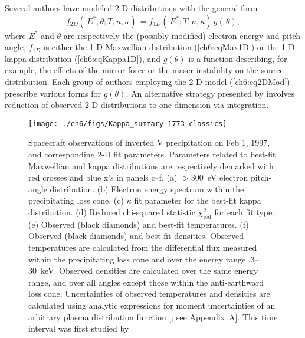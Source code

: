  Several authors \citep{Maggs1981,Bingham1999,Bingham2000,Mutel2007} have
  modeled 2-D distributions with the general form
    \begin{equation} \label{ch6:eq2DMod} f_{2D}(\, E^*, \theta ; T, n,
      \kappa) \, = f_{1D}(\, E^*; T, n, \kappa) \, g(\, \theta),
    \end{equation}
  where $E^*$ and $\theta$ are respectively the (possibly modified) electron
  energy and pitch angle, $f_{1D}$ is either the 1-D Maxwellian distribution
  (\ref{ch6:eqMax1D}) or the 1-D kappa distribution (\ref{ch6:eqKappa1D}), and
  $g(\theta )$ is a function describing, for example, the effects of the mirror
  force or the maser instability on the source distribution. Each group of
  authors employing the 2-D model (\ref{ch6:eq2DMod}) prescribe various forms
  for $g(\theta)$. An alternative strategy presented by \citet{Pritchett1999}
  involves reduction of observed 2-D distributions to one dimension via
  integration.


  \begin{figure}
    \centering
    \noindent\texttt{[image: ./ch6/figs/Kappa\_summary--1773-classics]}
    \caption[Inverted V precipitation and best-fit Maxwellian and kappa
    distribution parameters (Orbit 1773)]{Spacecraft observations of inverted V
      precipitation on Feb 1, 1997, and corresponding 2-D fit
      parameters. Parameters related to best-fit Maxwellian and kappa
      distributions are respectively demarked with red crosses and blue x's in
      panels c--f. (a) $>$300~eV electron pitch-angle distribution. (b) Electron
      energy spectrum within the precipitating loss cone. (c) $\kappa$ fit
      parameter for the best-fit kappa distribution. (d) Reduced chi-squared
      statistic $\chi^2_{\mathrm{red}}$ for each fit type. (e) Observed (black
      diamonds) and best-fit temperatures. (f) Observed (black diamonds) and
      best-fit densities. Observed temperatures are calculated from the
      differential flux measured within the precipitating loss cone and over the
      energy range .3--30~keV. Observed densities are calculated over the same
      energy range, and over all angles except those within the anti-earthward
      loss cone. Uncertainties of observed temperatures and densities are
      calculated using analytic expressions for moment uncertainties of an
      arbitrary plasma distribution function [\citealt{Gershman2015}; see
      Appendix~A]. This time interval was first studied by \citet{Elphic1998}}
    \label{ch6:Fig1}
  \end{figure}

